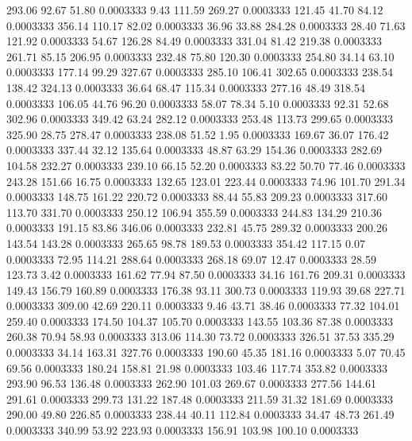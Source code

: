  293.06   92.67   51.80   0.0003333
   9.43  111.59  269.27   0.0003333
 121.45   41.70   84.12   0.0003333
 356.14  110.17   82.02   0.0003333
  36.96   33.88  284.28   0.0003333
  28.40   71.63  121.92   0.0003333
  54.67  126.28   84.49   0.0003333
 331.04   81.42  219.38   0.0003333
 261.71   85.15  206.95   0.0003333
 232.48   75.80  120.30   0.0003333
 254.80   34.14   63.10   0.0003333
 177.14   99.29  327.67   0.0003333
 285.10  106.41  302.65   0.0003333
 238.54  138.42  324.13   0.0003333
  36.64   68.47  115.34   0.0003333
 277.16   48.49  318.54   0.0003333
 106.05   44.76   96.20   0.0003333
  58.07   78.34    5.10   0.0003333
  92.31   52.68  302.96   0.0003333
 349.42   63.24  282.12   0.0003333
 253.48  113.73  299.65   0.0003333
 325.90   28.75  278.47   0.0003333
 238.08   51.52    1.95   0.0003333
 169.67   36.07  176.42   0.0003333
 337.44   32.12  135.64   0.0003333
  48.87   63.29  154.36   0.0003333
 282.69  104.58  232.27   0.0003333
 239.10   66.15   52.20   0.0003333
  83.22   50.70   77.46   0.0003333
 243.28  151.66   16.75   0.0003333
 132.65  123.01  223.44   0.0003333
  74.96  101.70  291.34   0.0003333
 148.75  161.22  220.72   0.0003333
  88.44   55.83  209.23   0.0003333
 317.60  113.70  331.70   0.0003333
 250.12  106.94  355.59   0.0003333
 244.83  134.29  210.36   0.0003333
 191.15   83.86  346.06   0.0003333
 232.81   45.75  289.32   0.0003333
 200.26  143.54  143.28   0.0003333
 265.65   98.78  189.53   0.0003333
 354.42  117.15    0.07   0.0003333
  72.95  114.21  288.64   0.0003333
 268.18   69.07   12.47   0.0003333
  28.59  123.73    3.42   0.0003333
 161.62   77.94   87.50   0.0003333
  34.16  161.76  209.31   0.0003333
 149.43  156.79  160.89   0.0003333
 176.38   93.11  300.73   0.0003333
 119.93   39.68  227.71   0.0003333
 309.00   42.69  220.11   0.0003333
   9.46   43.71   38.46   0.0003333
  77.32  104.01  259.40   0.0003333
 174.50  104.37  105.70   0.0003333
 143.55  103.36   87.38   0.0003333
 260.38   70.94   58.93   0.0003333
 313.06  114.30   73.72   0.0003333
 326.51   37.53  335.29   0.0003333
  34.14  163.31  327.76   0.0003333
 190.60   45.35  181.16   0.0003333
   5.07   70.45   69.56   0.0003333
 180.24  158.81   21.98   0.0003333
 103.46  117.74  353.82   0.0003333
 293.90   96.53  136.48   0.0003333
 262.90  101.03  269.67   0.0003333
 277.56  144.61  291.61   0.0003333
 299.73  131.22  187.48   0.0003333
 211.59   31.32  181.69   0.0003333
 290.00   49.80  226.85   0.0003333
 238.44   40.11  112.84   0.0003333
  34.47   48.73  261.49   0.0003333
 340.99   53.92  223.93   0.0003333
 156.91  103.98  100.10   0.0003333
